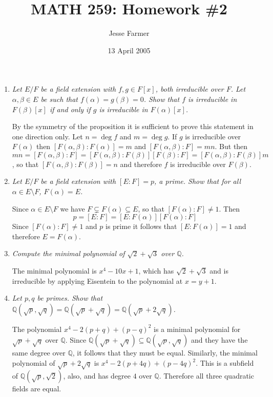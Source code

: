 \documentclass[10pt]{article}
\title{MATH 259: Homework \#2}
\author{Jesse Farmer}
\date{13 April 2005}
\newcommand{\Q}{\mathbb{Q}}
\begin{document}
\maketitle
\begin{enumerate}

\item \emph{Let $E/F$ be a field extension with $f,g \in F[x]$, both irreducible over $F$.  Let $\alpha, \beta \in E$ be such that $f(\alpha) = g(\beta) = 0$.  Show that $f$ is irreducible in $F(\beta)[x]$ if and only if $g$ is irreducible in $F(\alpha)[x]$.}

By the symmetry of the proposition it is sufficient to prove this statement in one direction only.  Let $n = \deg f$ and $m = \deg g$.  If $g$ is irreducible over $F(\alpha)$ then $[F(\alpha,\beta):F(\alpha)] = m$ and $[F(\alpha,\beta): F] = mn$.  But then $mn = [F(\alpha, \beta):F] = [F(\alpha,\beta):F(\beta)][F(\beta):F] = [F(\alpha,\beta):F(\beta)]m$, so that $[F(\alpha,\beta):F(\beta)] = n$ and therefore $f$ is irreducible over $F(\beta)$.

\item \emph{Let $E/F$ be a field extension with $[E:F] = p$, a prime.  Show that for all $\alpha \in E \setminus F$, $F(\alpha) = E$.}

Since $\alpha \in E \setminus F$ we have $F \subsetneq F(\alpha) \subseteq E$, so that $[F(\alpha):F] \neq 1$.  Then $$p = [E:F] = [E:F(\alpha)][F(\alpha):F]$$  Since $[F(\alpha):F] \neq 1$ and $p$ is prime it follows that $[E:F(\alpha)] = 1$ and therefore $E = F(\alpha)$.

\item \emph{Compute the minimal polynomial of $\sqrt{2} + \sqrt{3}$ over $\Q$.}

The minimal polynomial is $x^4 - 10x + 1$, which has $\sqrt{2} + \sqrt{3}$ and is irreducible by applying Eisentein to the polynomial at $x = y+1$.

\item \emph{Let $p,q$ be primes.  Show that $\Q(\sqrt{p}, \sqrt{q}) = \Q(\sqrt{p} + \sqrt{q}) = \Q(\sqrt{p} + 2\sqrt{q})$.}

The polynomial $x^4 - 2(p+q) + (p-q)^2$ is a minimal polynomial for $\sqrt{p} + \sqrt{q}$ over $\Q$.  Since $\Q(\sqrt{p} + \sqrt{q}) \subseteq \Q(\sqrt{p}, \sqrt{q})$ and they have the same degree over $\Q$, it follows that they must be equal. Similarly, the minimal polynomial of $\sqrt{p} + 2\sqrt{q}$ is $x^4 - 2(p+4q) + (p-4q)^2$.  This is a subfield of $\Q(\sqrt{p}, \sqrt{2})$, also, and has degree $4$ over $\Q$.  Therefore all three quadratic fields are equal.


\end{enumerate}
\end{document}
